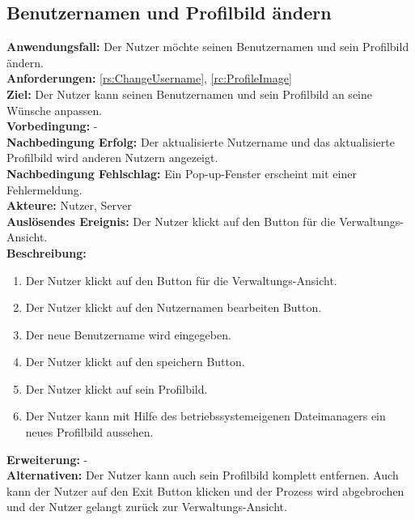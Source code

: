 \documentclass[parskip=full]{scrartcl}
\begin{document}
\subsection{Benutzernamen und Profilbild ändern}
\textbf{Anwendungsfall:} Der Nutzer möchte seinen Benutzernamen und sein Profilbild ändern.\\
\textbf{Anforderungen:} \ref{rs:ChangeUsername}, \ref{rc:ProfileImage}\\
\textbf{Ziel:} Der Nutzer kann seinen Benutzernamen und sein Profilbild an seine Wünsche anpassen.\\
\textbf{Vorbedingung:} -\\
\textbf{Nachbedingung Erfolg:} Der aktualisierte Nutzername und das aktualisierte Profilbild wird anderen Nutzern angezeigt.\\
\textbf{Nachbedingung Fehlschlag:} Ein Pop-up-Fenster erscheint mit einer Fehlermeldung.\\
\textbf{Akteure:} Nutzer, Server\\
\textbf{Auslösendes Ereignis:} Der Nutzer klickt auf den Button für die Verwaltungs-Ansicht.\\
\textbf{Beschreibung:}
\begin{enumerate}
    \item Der Nutzer klickt auf den Button für die Verwaltungs-Ansicht.
    \item Der Nutzer klickt auf den Nutzernamen bearbeiten Button.
    \item Der neue Benutzername wird eingegeben.
    \item Der Nutzer klickt auf den speichern Button.
    \item Der Nutzer klickt auf sein Profilbild.
    \item Der Nutzer kann mit Hilfe des betriebssystemeigenen Dateimanagers ein neues Profilbild aussehen.
\end{enumerate}
\textbf{Erweiterung:} -\\
\textbf{Alternativen:} Der Nutzer kann auch sein Profilbild komplett entfernen. Auch kann der Nutzer auf den Exit Button klicken und der Prozess wird abgebrochen und der Nutzer gelangt zurück zur Verwaltungs-Ansicht.\\
\newpage
\end{document}
